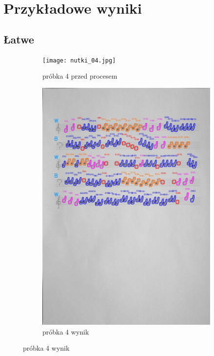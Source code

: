 \documentclass[11pt]{article}
\begin{document}
\section{Przykładowe wyniki}

\subsection{Łatwe}

\begin{figure}[H]
    \centering
    \begin{subfigure}[b]{0.475\textwidth}
        \centering
        \graphicspath{ {Resources/} }
        \texttt{[image: nutki\_04.jpg]}
        \caption[]%
        {{\small próbka 4 przed procesem}}
        \label{fig:sub1}
    \end{subfigure}
    \hfill
    \begin{subfigure}[b]{0.475\textwidth}
        \centering
        \graphicspath{ {blobs/} }
        \includegraphics[width=\textwidth]{4_cnts.jpg}
        \caption[]%
        {{\small próbka 4 wynik}}
        \label{fig:sub2}
    \end{subfigure}
\end{figure}
\end{document}

